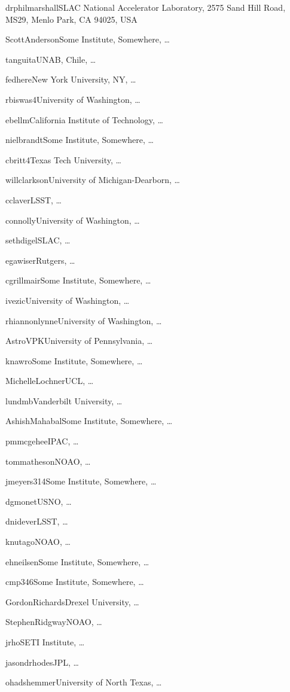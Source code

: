 
\vspace{4\baselineskip}


\vspace{\baselineskip}

\author{Phil Marshall}{drphilmarshall}{SLAC National Accelerator Laboratory, 2575 Sand Hill Road, MS29, Menlo Park, CA 94025, USA}
\author{Scott Anderson}{ScottAnderson}{Some Institute, Somewhere, \ldots}
\author{Timo Anguita}{tanguita}{UNAB, Chile, \ldots}
\author{Federica B. Bianco}{fedhere}{New York University, NY, \ldots}
\author{Rahul Biswas}{rbiswas4}{University of Washington, \ldots}
\author{Eric C.\ Bellm}{ebellm}{California Institute of Technology, \ldots}
\author{Niel Brandt}{nielbrandt}{Some Institute, Somewhere, \ldots}
\author{Chris Britt}{cbritt4}{Texas Tech University, \ldots}
\author{Will Clarkson}{willclarkson}{University of Michigan-Dearborn, \ldots}
\author{Chuck Claver}{cclaver}{LSST, \ldots}
\author{Andy Connolly}{connolly}{University of Washington, \ldots}
\author{Seth Digel}{sethdigel}{SLAC, \ldots}
\author{Eric Gawiser}{egawiser}{Rutgers, \ldots}
\author{Carl Grillmair}{cgrillmair}{Some Institute, Somewhere, \ldots}
\author{\v{Z}eljko Ivezi\'{c}}{ivezic}{University of Washington, \ldots}
\author{Lynne Jones}{rhiannonlynne}{University of Washington, \ldots}
\author{Vishal Kasliwal}{AstroVPK}{University of Pennsylvania, \ldots}
\author{Someonecalled Knawro}{knawro}{Some Institute, Somewhere, \ldots}
\author{Michelle Lochner}{MichelleLochner}{UCL, \ldots}
\author{Michael B.\ Lund}{lundmb}{Vanderbilt University, \ldots}
\author{Ashish Mahabal}{AshishMahabal}{Some Institute, Somewhere, \ldots}
\author{Peregrine McGehee}{pmmcgehee}{IPAC, \ldots}
\author{Tom Matheson}{tommatheson}{NOAO, \ldots}
\author{Josh Meyers}{jmeyers314}{Some Institute, Somewhere, \ldots}
\author{Dave Monet}{dgmonet}{USNO, \ldots}
\author{David Nidever}{dnidever}{LSST, \ldots}
\author{Knut Olsen}{knutago}{NOAO, \ldots}
\author{Eric Neilsen}{ehneilsen}{Some Institute, Somewhere, \ldots}
\author{Christina Peters}{cmp346}{Some Institute, Somewhere, \ldots}
\author{Gordon Richards}{GordonRichards}{Drexel University, \ldots}
\author{Stephen Ridgway}{StephenRidgway}{NOAO, \ldots}
\author{Jeonghee Rho}{jrho}{SETI Institute, \ldots}
\author{Jason Rhodes}{jasondrhodes}{JPL, \ldots}
\author{Ohad Shemmer}{ohadshemmer}{University of North Texas, \ldots}
